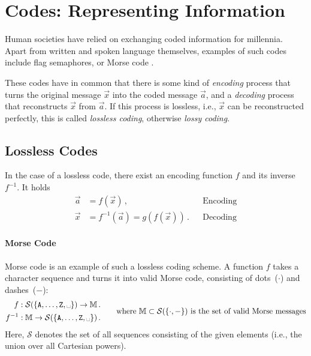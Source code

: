 \documentclass[10pt,letterpaper,oneside]{article}
\begin{document}
\section{Codes: Representing Information}

Human societies have relied on exchanging coded information for millennia. Apart from written and spoken language themselves, examples of such codes include flag semaphores, or Morse code \cite{2009itur}.

These codes have in common that there is some kind of \emph{encoding} process that turns the original message $\vec x$ into the coded message $\vec a$, and a \emph{decoding} process that reconstructs $\vec x$ from $\vec a$. If this process is lossless, i.e., $\vec x$ can be reconstructed perfectly, this is called \emph{lossless coding}, otherwise \emph{lossy coding}.

\subsection{Lossless Codes}

In the case of a lossless code, there exist an encoding function $f$ and its inverse $f^{-1}$. It holds
\begin{align*}
	\vec a &= f(\vec x) \,, && \text{Encoding} \\
	\vec x &= f^{-1}(\vec a) = g(f(\vec x)) \,. && \text{Decoding} 
\end{align*}

\paragraph{Morse Code} Morse code is an example of such a lossless coding scheme. A function $f$ takes a character sequence and turns it into valid Morse code, consisting of dots~($\cdot$) and dashes~($-$):
\begin{align*}
	\begin{aligned}
	f&: \mathcal{S}(\{\mathtt{A}, \ldots, \mathtt{Z}, \text{\textvisiblespace}\}) \rightarrow \mathbb{M} \,. \\
	f^{-1} &: \mathbb{M} \rightarrow \mathcal{S}(\{\mathtt{A}, \ldots, \mathtt{Z}, \text{\textvisiblespace}\}) \,.
	\end{aligned} &&\quad \text{where } \mathbb{M} \subset \mathcal{S}(\{\cdot, -\}) \text{ is the set of valid Morse messages}
\end{align*}
Here, $\mathcal{S}$ denotes the set of all sequences consisting of the given elements (i.e., the union over all Cartesian powers).
\end{document}
